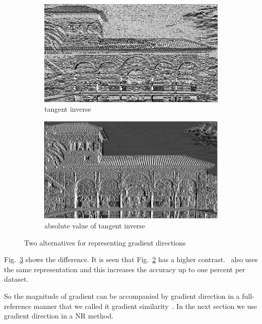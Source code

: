 \begin{figure}
     \centering
     \begin{subfigure}[b]{0.49\textwidth}
         \centering
         \includegraphics[width=\textwidth]{./figs/dir_ref}
         \caption{tangent inverse}
         \label{fig:tantan}
     \end{subfigure}
     \hfill
     \begin{subfigure}[b]{0.49\textwidth}
         \centering
         \includegraphics[width= \textwidth]{./figs/mm_dir}
         \caption{absolute value of tangent inverse}
         \label{fig:magtan}
     \end{subfigure}
     \caption{Two alternatives for representing gradient directions}
        \label{fig:magtantan}
\end{figure}
Fig.~\ref{fig:magtantan} shows the difference. It is seen that Fig.~\ref{fig:magtan} has a higher contrast.~\cite{Dalal2005} also uses the same representation and this increases the accuracy up to one percent per dataset.

So the magnitude of gradient can be accompanied by gradient direction in a full-reference manner that we called it gradient similarity~\cite{cheraaqee2019incorporating}. In the next section we use gradient direction in a NR method.
